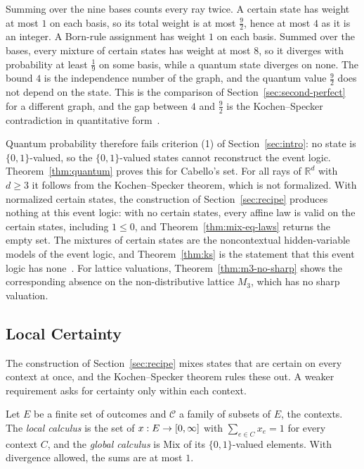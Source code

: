 \noindent
Summing over the nine bases counts every ray twice. A certain state has
weight at most $1$ on each basis, so its total weight is at most
$\tfrac92$, hence at most $4$ as it is an integer. A Born-rule assignment
has weight $1$ on each basis. Summed over the bases, every mixture of
certain states has weight at most $8$, so it diverges with probability at
least $\tfrac19$ on some basis, while a quantum state diverges on none.
The bound $4$ is the independence number of the graph, and the quantum
value $\tfrac92$ does not depend on the state. This is the comparison of
Section~\ref{sec:second-perfect} for a different graph, and the gap
between $4$ and $\tfrac92$ is the Kochen--Specker contradiction in
quantitative form~\cite{cabello2008,cabello2014}.

Quantum probability therefore fails criterion (1) of
Section~\ref{sec:intro}: no state is $\{0,1\}$-valued, so the
$\{0,1\}$-valued states cannot reconstruct the event logic.
Theorem~\ref{thm:quantum} proves this for Cabello's set. For all rays of
$\mathbb{R}^d$ with $d \ge 3$ it follows from the Kochen--Specker theorem, which is not
formalized. With normalized certain states, the construction of
Section~\ref{sec:recipe} produces nothing at this event logic: with no
certain states, every affine law is
valid on the certain states, including $1 \le 0$, and
Theorem~\ref{thm:mix-eq-laws} returns the empty set. The mixtures of
certain states are the noncontextual hidden-variable models of the event
logic, and Theorem~\ref{thm:ks} is the statement that this event logic
has none~\cite{kochen-specker1967}. For lattice valuations,
Theorem~\ref{thm:m3-no-sharp} shows the corresponding absence on the
non-distributive lattice $M_3$, which has no sharp valuation.

\subsection{Local Certainty}
\label{sec:quantum-local}

The construction of Section~\ref{sec:recipe} mixes states that are
certain on every context at once, and the Kochen--Specker theorem rules
these out. A weaker requirement asks for certainty only within each
context.

\begin{definition}
\label{def:local}
Let $E$ be a finite set of outcomes and $\mathcal{C}$ a family of subsets
of $E$, the contexts. The \emph{local calculus} is the set of
$x : E \to [0,\infty]$ with $\sum_{e \in C} x_e = 1$ for every context $C$,
and the \emph{global calculus} is $\mathrm{Mix}$ of its $\{0,1\}$-valued
elements. With divergence allowed, the sums are at most $1$.
\end{definition}

